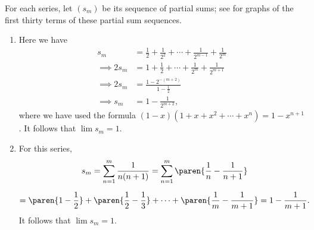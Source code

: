 \documentclass{lew98_solutions}
\begin{document}
\begin{solution}
    For each series, let \( (s_m) \) be its sequence of partial sums; see  for graphs of the first thirty terms of these partial sum sequences.
    \begin{enumerate}
        \item Here we have
        \begin{align*}
            s_m &= \frac{1}{2} + \frac{1}{2^2} + \cdots + \frac{1}{2^{m-1}} + \frac{1}{2^m} \\[2mm]
            \implies 2 s_m &= 1 + \frac{1}{2} + \cdots + \frac{1}{2^m} + \frac{1}{2^{m+1}} \\[2mm]
            \implies 2 s_m &= \frac{1 - 2^{-(m+2)}}{1 - \tfrac{1}{2}} \\[2mm]
            \implies s_m &= 1 - \frac{1}{2^{m+2}},
        \end{align*}
        where we have used the formula \( (1 - x)(1 + x + x^2 + \cdots + x^n) = 1 - x^{n+1} \). It follows that \( \lim s_m = 1 \).

        \item For this series,
        \begin{multline*}
            s_m = \sum_{n=1}^m \frac{1}{n(n+1)} = \sum_{n=1}^m \paren{ \frac{1}{n} - \frac{1}{n+1} } \\[2mm]
            = \paren{ 1 - \frac{1}{2} } + \paren{ \frac{1}{2} - \frac{1}{3} } + \cdots + \paren{ \frac{1}{m} - \frac{1}{m+1} } = 1 - \frac{1}{m+1}.
        \end{multline*}
        It follows that \( \lim s_m = 1 \).


\end{enumerate}
\end{solution}
\end{document}
